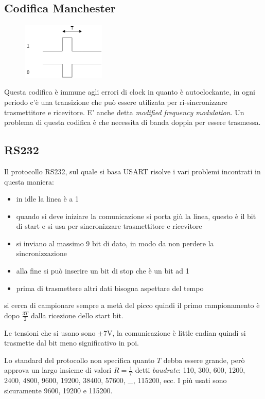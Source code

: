 \subsection{Codifica Manchester}
\begin{figure}[H]
    \centering
    \includegraphics[width=150px]{images/22_USART/manchester_encoding.png}
\end{figure}
Questa codifica è immune agli errori di clock in quanto è autoclockante, in ogni periodo c'è una transizione che può essere utilizata per ri-sincronizzare trasmettitore e ricevitore.
E' anche detta \emph{modified frequency modulation}.
Un problema di questa codifica è che necessita di banda doppia per essere trasmessa.

\subsection{RS232}
Il protocollo RS232, sul quale si basa USART risolve i vari problemi incontrati in questa maniera:
\begin{itemize}
    \item in idle la linea è a 1
    \item quando si deve iniziare la comunicazione si porta giù la linea, questo è il bit di start e si usa per sincronizzare trasmettitore e ricevitore
    \item si inviano al massimo 9 bit di dato, in modo da non perdere la sincronizzazione
    \item alla fine si può inserire un bit di stop che è un bit ad 1
    \item prima di trasmettere altri dati bisogna aspettare del tempo
\end{itemize}
si cerca di campionare sempre a metà del picco quindi il primo campionamento è dopo $\frac{3T}{2}$ dalla ricezione dello start bit.

Le tensioni che si usano sono $\pm 7$V, la comunicazione è little endian quindi si trasmette dal bit meno significativo in poi.

Lo standard del protocollo non specifica quanto $T$ debba essere grande, però approva un largo insieme di valori $R = \frac{1}{T}$ detti \emph{baudrate}: 110, 300, 600, 1200, 2400, 4800, 9600, 19200, 38400, 57600, \_, 115200, ecc.
I più usati sono sicuramente 9600, 19200 e 115200.

